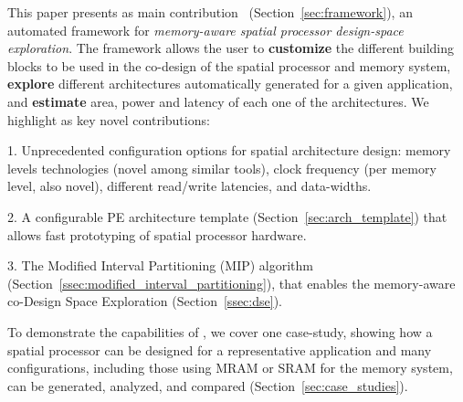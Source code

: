 This paper presents as main contribution \frameworkname~(Section~\ref{sec:framework}), an automated framework for \textit{memory-aware spatial processor design-space exploration}. The framework allows the user to \textbf{customize} the different building blocks to be used in the co-design of the spatial processor and memory system, \textbf{explore} different architectures automatically generated for a given application, and \textbf{estimate} area, power and latency of each one of the architectures.
We highlight as key novel contributions:

1. Unprecedented configuration options for spatial architecture design: memory levels technologies (novel among similar tools), clock frequency (per memory level, also novel), different read/write latencies, and data-widths.

2. A configurable PE architecture template (Section~\ref{sec:arch_template}) that allows fast prototyping of spatial processor hardware.

3. The Modified Interval Partitioning (MIP) algorithm (Section~\ref{ssec:modified_interval_partitioning}), that enables the memory-aware co-Design Space Exploration (Section~\ref{ssec:dse}).

To demonstrate the capabilities of \frameworkname, we cover one case-study, showing how a spatial processor can be designed for a representative application and many configurations, including those using MRAM or SRAM for the memory system, can be generated, analyzed, and compared (Section~\ref{sec:case_studies}).




